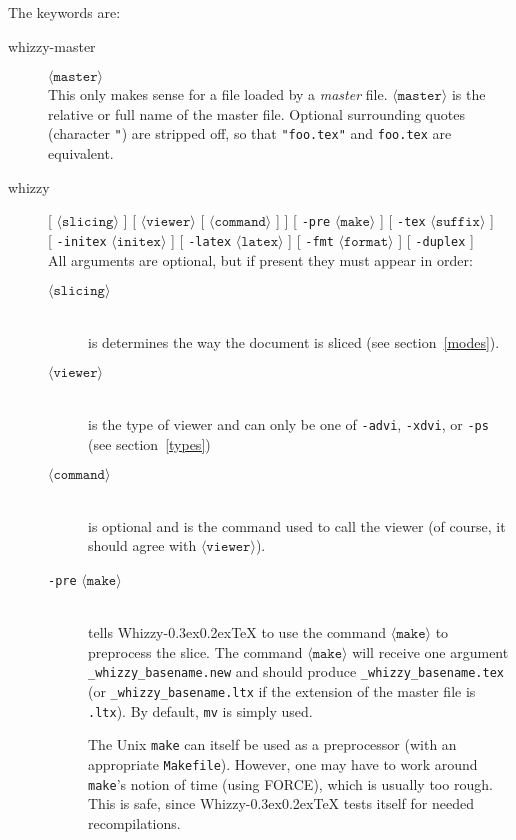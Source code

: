 \documentclass[12pt]{article}
\makeatletter
\let \lst \verb
\def \whizzy {{Whizzy\kern -0.3ex\raise 0.2ex\hbox{\let \@\relax\TeX}}}
\makeatother
\begin{document}
The keywords are:
\def \arg#1{$\langle\texttt {#1}\rangle$}
\def \opt#1{[ #1 ]}
\begin{description}
\item[whizzy-master]\arg {master}
\\
This only makes sense for a file loaded by a {\em master} file. 
\arg{master} is the relative or full name of the
master file. Optional surrounding quotes (character \lst$"$) are
stripped off, so that \lst$"foo.tex"$ and \lst"foo.tex" are equivalent.

\item[whizzy] 
\opt{\arg{slicing}} 
\opt{\arg{viewer} \opt{\arg{command}}}
\opt{\texttt{-pre} \arg{make}} 
\opt{\texttt{-tex} \arg{suffix}} 
\hfil \\ \hbox{}\hfill
\opt{\texttt{-initex} \arg{initex}}
\opt{\texttt{-latex} \arg{latex}}
\opt{\texttt{-fmt} \arg{format}}
\opt{\texttt{-duplex}}
\\[1em]
All arguments are optional, but if present they must appear in order:
\begin{description}
\item[\arg{slicing}]\indent\\ 
is determines the way the document is sliced
(see section~\ref{modes}).

\item[\arg{viewer}]\indent\\
is the type of viewer and can only be one of 
\lst"-advi", \lst"-xdvi", or \lst"-ps" (see section~\ref{types})

\item[\arg{command}]\indent\\
is optional and is the command used to call the viewer
(of course, it should agree with \arg{viewer}). 

\item[\texttt{-pre} \arg{make}]\indent\\
tells {\whizzy} to use the command \arg{make} to preprocess
the slice. 
The command \arg{make} will receive one argument
\texttt{\_whizzy\_basename.new} and should produce 
\texttt{\_whizzy\_basename.tex}
(or \texttt{\_whizzy\_basename.ltx} if the extension of the master file is 
\texttt{.ltx}).
By default, \lst"mv" is simply used.

The Unix \lst"make"  can itself be used as a preprocessor (with an
appropriate \lst"Makefile").  However, one may have to work around
\lst"make"'s notion of time (using FORCE), which is usually too rough. 
This is safe, since {\whizzy} tests itself for needed recompilations.


\end{description}
\end{description}
\end{document}
